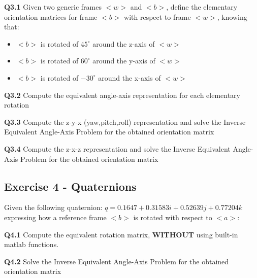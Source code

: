 \textbf{Q3.1} Given two generic frames $<w>$ and $<b>$, define the elementary orientation matrices for frame $<b>$ with respect to frame $<w>$, knowing that:
\begin{itemize}
    \item $<b>$ is rotated of $45^\circ$ around the z-axis of $<w>$
    \item $<b>$ is rotated of $60^\circ$ around the y-axis of $<w>$
    \item $<b>$ is rotated of $-30^\circ$ around the x-axis of $<w>$
\end{itemize}

\textbf{Q3.2} Compute the equivalent angle-axis representation for each elementary rotation

\textbf{Q3.3} Compute the z-y-x (yaw,pitch,roll) representation and solve the Inverse Equivalent Angle-Axis Problem for the obtained orientation matrix

\textbf{Q3.4} Compute the z-x-z representation and solve the Inverse Equivalent Angle-Axis Problem for the obtained orientation matrix

\subsection{Exercise 4 - Quaternions}
Given the following quaternion: $q = 0.1647 + 0.31583i + 0.52639j + 0.77204k$ expressing how a reference frame $<b>$ is rotated with respect to $<a>$:

\textbf{Q4.1} Compute the equivalent rotation matrix, \textbf{WITHOUT} using built-in matlab functions.

\textbf{Q4.2} Solve the Inverse Equivalent Angle-Axis Problem for the obtained orientation matrix

\newpage